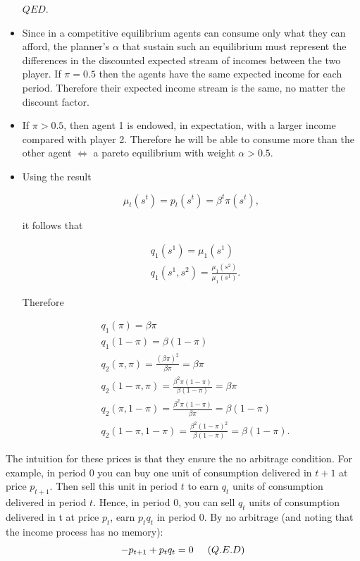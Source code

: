\documentclass[12pt,a4paper]{article}
\begin{document}
\begin{itemize}
  $QED$.

  \item Since in a competitive equilibrium agents can consume only what they can afford, the planner's $\alpha$ that sustain such an equilibrium must represent the differences in the discounted expected stream of incomes between the two player. If $\pi = 0.5$ then the agents have the same expected income for each period. Therefore their expected income stream is the same, no matter the discount factor.

  \item If $\pi > 0.5$, then agent 1 is endowed, in expectation, with a larger income compared with player 2. Therefore he will be able to consume more than the other agent $\Leftrightarrow$ a pareto equilibrium with weight $\alpha > 0.5$.

  \item Using the result

  $$
    \mu_t(s^t) = p_t(s^t) = \beta^t \pi(s^t),
  $$

  it follows that

  \begin{align*}
    & q_1(s^1) = \mu_1(s^1) \\
    & q_1(s^1,s^2) = \frac{\mu_1(s^2)}{\mu_1(s^1)}.
  \end{align*}

  Therefore

  \begin{align*}
    & q_1(\pi) = \beta \pi \\
    & q_1(1 - \pi) = \beta (1 - \pi) \\
    & q_2(\pi, \pi) = \frac{(\beta\pi)^2}{\beta \pi} = \beta \pi \\
    & q_2(1 - \pi, \pi) = \frac{\beta^2\pi(1-\pi)}{\beta (1 - \pi)} = \beta \pi \\
    & q_2(\pi, 1 - \pi) = \frac{\beta^2\pi(1-\pi)}{\beta \pi} = \beta ( 1 - \pi) \\
    & q_2(1 - \pi, 1 - \pi) = \frac{\beta^2(1-\pi)^2}{\beta (1 - \pi)} = \beta (1 - \pi).
  \end{align*}

\end{itemize}

\item The intuition for these prices is that they ensure the no arbitrage condition. For example, in period 0 you can buy one unit of consumption delivered in $t+1$ at price $p_{t+1}$. Then sell this unit in period $t$ to earn $q_{t}$ units of consumption delivered in period $t$. Hence, in period 0, you can sell $q_t$ units of consumption delivered in t at price $p_t$, earn $p_{t}q_{t}$ in period 0. By no arbitrage (and noting that the income process has no memory):
\begin{equation*}
    -p_{t+1}+p_tq_t=0 \hspace{5mm}(Q.E.D)
\end{equation*}
\end{document}
